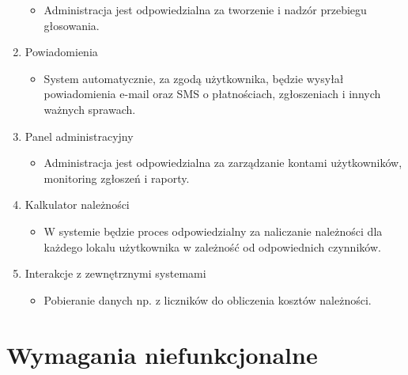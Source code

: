\begin{enumerate}[label=\arabic*.]
\begin{itemize}
        \item Administracja jest odpowiedzialna za tworzenie i nadzór przebiegu głosowania.
    \end{itemize}
    \item Powiadomienia
    \begin{itemize}
        \item System automatycznie, za zgodą użytkownika, będzie wysyłał powiadomienia e-mail oraz SMS o płatnościach, zgłoszeniach i innych ważnych sprawach.
    \end{itemize}
    \item Panel administracyjny
    \begin{itemize}
        \item Administracja jest odpowiedzialna za zarządzanie kontami użytkowników, monitoring zgłoszeń i raporty.
    \end{itemize}
    \item Kalkulator należności
    \begin{itemize}
        \item W systemie będzie proces odpowiedzialny za naliczanie należności dla każdego lokalu użytkownika w zależność od odpowiednich czynników.
    \end{itemize}
    \item Interakcje z zewnętrznymi systemami
    \begin{itemize}
        \item Pobieranie danych np. z liczników do obliczenia kosztów należności.
    \end{itemize}
\end{enumerate}

\section{Wymagania niefunkcjonalne}


